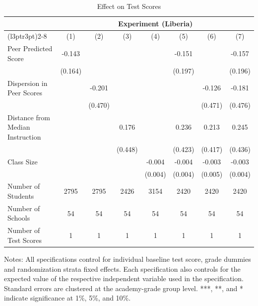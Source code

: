 \begin{table}[!h]
\centering\centering\centering
\caption{Effect on Test Scores}
\centering
\begin{threeparttable}
\fontsize{10}{12}\selectfont
\begin{tabular}[t]{lccccccc}
\toprule
\multicolumn{1}{c}{ } & \multicolumn{7}{c}{Experiment (Liberia)} \\
\cmidrule(l{3pt}r{3pt}){2-8}
  & (1) & (2) & (3) & (4) & (5) & (6) & (7)\\
\midrule
Peer Predicted Score & -0.143 &  &  &  & -0.151 &  & -0.157\\
 & (0.164) &  &  &  & (0.197) &  & (0.196)\\
Dispersion in Peer Scores &  & -0.201 &  &  &  & -0.126 & -0.181\\
 &  & (0.470) &  &  &  & (0.471) & (0.476)\\
Distance from Median Instruction &  &  & 0.176 &  & 0.236 & 0.213 & 0.245\\
 &  &  & (0.448) &  & (0.423) & (0.417) & (0.436)\\
Class Size &  &  &  & -0.004 & -0.004 & -0.003 & -0.003\\
 &  &  &  & (0.004) & (0.004) & (0.005) & (0.004)\\
\hline
\midrule
Number of Students & 2795 & 2795 & 2426 & 3154 & 2420 & 2420 & 2420\\
Number of Schools & 54 & 54 & 54 & 54 & 54 & 54 & 54\\
Number of Test Scores & 1 & 1 & 1 & 1 & 1 & 1 & 1\\
\bottomrule
\end{tabular}
\begin{tablenotes}[para]
\item Notes: All specifications control for individual baseline test score,
                        grade dummies and randomization strata fixed effects. Each specification
                        also controls for the expected value of the respective independent variable
                         used in the specification. Standard errors are clustered at the academy-grade
                          group level. ***, **, and * indicate significance at 1\%, 5\%, and 10\%.
\end{tablenotes}
\end{threeparttable}
\end{table}
